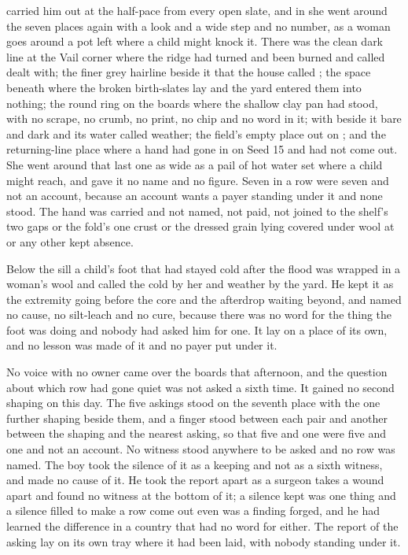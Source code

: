  carried him out at the half-pace from every open slate, and in  she went around the seven places again with a look and a wide step and no number, as a woman goes around a pot left where a child might knock it. There was the clean dark line at the Vail corner where the  ridge had turned and been burned and called dealt with; the finer grey hairline beside it that the house called ; the space beneath  where the broken birth-slates lay and the yard entered them into nothing; the round ring on the boards where the shallow clay pan had stood, with no scrape, no crumb, no print, no chip and no word in it;  with  beside it bare and dark and its water called weather; the field's empty place out on ; and the returning-line place where a hand had gone in on Seed 15 and had not come out. She went around that last one as wide as a pail of hot water set where a child might reach, and gave it no name and no figure. Seven in a row were seven and not an account, because an account wants a payer standing under it and none stood. The hand was carried and not named, not paid, not joined to the shelf's two gaps or the fold's one crust or the dressed grain lying covered under wool at  or any other kept absence.

Below the sill a child's foot that had stayed cold after the flood was wrapped in a woman's wool and called the cold by her and weather by the yard. He kept it as the extremity going before the core and the afterdrop waiting beyond, and named no cause, no silt-leach and no cure, because there was no  word for the thing the foot was doing and nobody had asked him for one. It lay on a place of its own, and no lesson was made of it and no payer put under it.

No voice with no owner came over the boards that afternoon, and the question about which row had gone quiet was not asked a sixth time. It gained no second shaping on this day. The five askings stood on the seventh place with the one further shaping beside them, and a finger stood between each pair and another between the shaping and the nearest asking, so that five and one were five and one and not an account. No witness stood anywhere to be asked and no row was named. The boy took the silence of it as a keeping and not as a sixth witness, and made no cause of it. He took the report apart as a surgeon takes a wound apart and found no witness at the bottom of it; a silence kept was one thing and a silence filled to make a row come out even was a finding forged, and he had learned the difference in a country that had no word for either. The report of the asking lay on its own tray where it had been laid, with nobody standing under it.

